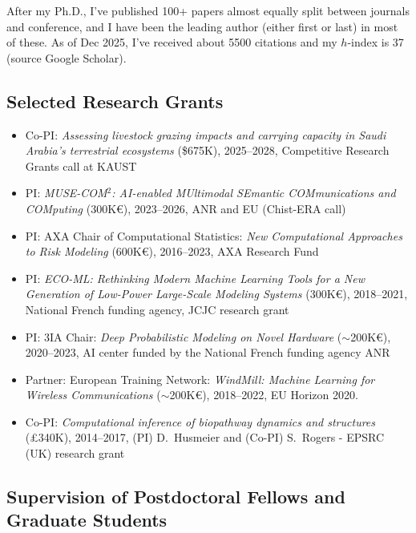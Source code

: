 \documentclass[oneside, a4paper, onecolumn, 10pt]{article}
\begin{document}
After my Ph.D., I've published 100+ papers almost equally split between journals and conference, and I have been the leading author (either first or last) in most of these.
As of Dec 2025, I've received about 5500 citations and my $h$-index is 37 (source Google Scholar).

\subsection*{Selected Research Grants}
\begin{itemize}
  \item Co-PI: \emph{Assessing livestock grazing impacts and carrying capacity in Saudi Arabia's terrestrial ecosystems} (\$675K), 2025--2028, Competitive Research Grants call at KAUST
  \item PI: \emph{MUSE-COM$^2$: AI-enabled MUltimodal SEmantic COMmunications and COMputing} (300K\euro), 2023--2026, ANR and EU (Chist-ERA call)
  \item PI: AXA Chair of Computational Statistics: \emph{New Computational Approaches to Risk Modeling} (600K\euro), 2016--2023, AXA Research Fund 
  \item PI: \emph{ECO-ML: Rethinking Modern Machine Learning Tools for a New Generation of Low-Power Large-Scale Modeling Systems} (300K\euro), 2018--2021, National French funding agency, JCJC research grant
  \item PI: 3IA Chair: \emph{Deep Probabilistic Modeling on Novel Hardware} ($\sim$200K\euro), 2020--2023, AI center funded by the National French funding agency ANR
  \item Partner: European Training Network: \emph{WindMill: Machine Learning for Wireless Communications} ($\sim$200K\euro), 2018--2022, EU Horizon 2020.
  \item Co-PI: \emph{Computational inference of biopathway dynamics and structures} (\pounds 340K), 2014--2017, (PI) D.~Husmeier and (Co-PI) S.~Rogers - EPSRC (UK) research grant 
\end{itemize}



\subsection*{Supervision of Postdoctoral Fellows and Graduate Students}
\end{document}
